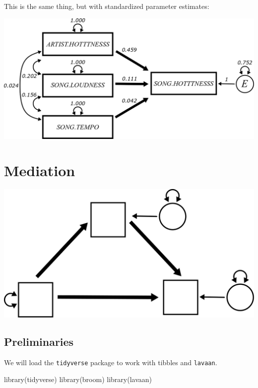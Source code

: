 \documentclass[
]{book}
\newenvironment{Shaded}{\begin{snugshade}}{\end{snugshade}}
\newcommand{\FunctionTok}[1]{\textcolor[rgb]{0.00,0.00,0.00}{#1}}
\newcommand{\NormalTok}[1]{#1}
\begin{document}
This is the same thing, but with standardized parameter estimates:

\begin{center}\includegraphics{graphics/multiple_regression_music_std} \end{center}

\hypertarget{mediation}{%
\chapter{Mediation}\label{mediation}}

\begin{center}\includegraphics{graphics/mediation} \end{center}

\hypertarget{preliminaries-2}{%
\section*{Preliminaries}\label{preliminaries-2}}

We will load the \texttt{tidyverse} package to work with tibbles and \texttt{lavaan}.

\begin{Shaded}
\begin{Highlighting}[]
\FunctionTok{library}\NormalTok{(tidyverse)}
\FunctionTok{library}\NormalTok{(broom)}
\FunctionTok{library}\NormalTok{(lavaan)}
\end{Highlighting}
\end{Shaded}
\end{document}

